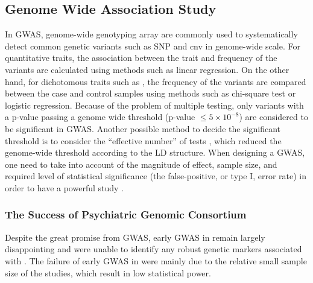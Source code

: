 \documentclass[12pt]{scrbook}
\newcommand*{\glng}{\glsentrylong}
\begin{document}
	\subsection{Genome Wide Association Study}
	In \gls{GWAS}, genome-wide genotyping array are commonly used to systematically detect common genetic variants such as \gls{SNP} and \gls{cnv} in genome-wide scale.
	For quantitative traits, the association between the trait and frequency of the variants are calculated using methods such as linear regression.
	On the other hand, for dichotomous traits such as \glng{scz}, the frequency of the variants are compared between the case and control samples using methods such as chi-square test or logistic regression.
	Because of the problem of multiple testing, only variants with a p-value passing a genome wide threshold (p-value $\le5\times10^{-8}$) are considered to be significant in \gls{GWAS}.
	Another possible method to decide the significant threshold is to consider the ``effective number'' of tests \citep{Li2011}, which reduced the genome-wide threshold according to the \gls{LD} structure.
	When designing a \gls{GWAS}, one need to take into account of the magnitude of effect, sample size, and required level of statistical significance (the false-positive, or type I, error rate) in order to have a powerful study \citep{Purcell2003}.
	
	\subsubsection{The Success of Psychiatric Genomic Consortium} 
	Despite the great promise from \gls{GWAS}, early \gls{GWAS} in \glng{scz} remain largely disappointing and were unable to identify any robust genetic markers associated with \glng{scz}.
	The failure of early \gls{GWAS} in \glng{scz} were mainly due to the relative small sample size of the studies, which result in low statistical power.
	
\end{document}
